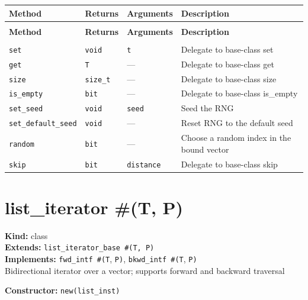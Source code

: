 \documentclass[11pt,letterpaper]{report}
\begin{document}
\begin{xltabular}{\linewidth}{>{\small}p{1.35in} >{\small}p{1.25in} >{\small}p{0.95in} >{\small}X}
\toprule
\textbf{Method} & \textbf{Returns} & \textbf{Arguments} & \textbf{Description} \\
\midrule
\endfirsthead
{} \\
\midrule
\textbf{Method} & \textbf{Returns} & \textbf{Arguments} & \textbf{Description} \\
\midrule
\endhead
\midrule
{} \\
\endfoot
\bottomrule
\endlastfoot
\texttt{set} & \texttt{void} & \texttt{t} & Delegate to base-class set \\
\texttt{get} & \texttt{T} & --- & Delegate to base-class get \\
\texttt{size} & \texttt{size\_t} & --- & Delegate to base-class size \\
\texttt{is\_empty} & \texttt{bit} & --- & Delegate to base-class is\_empty \\
\texttt{set\_seed} & \texttt{void} & \texttt{seed} & Seed the RNG \\
\texttt{set\_default\_seed} & \texttt{void} & --- & Reset RNG to the default seed \\
\texttt{random} & \texttt{bit} & --- & Choose a random index in the bound vector \\
\texttt{skip} & \texttt{bit} & \texttt{distance} & Delegate to base-class skip \\
\end{xltabular}

\section{list\_iterator \#(T, P)}
\label{cls:listiteratorTP}

\noindent\textbf{Kind:} class\\
\noindent\textbf{Extends:} \texttt{list\_iterator\_base \#(T, P)}\\
\noindent\textbf{Implements:} \texttt{fwd\_intf \#(T}, \texttt{P)}, \texttt{bkwd\_intf \#(T}, \texttt{P)}\\
\noindent Bidirectional iterator over a vector; supports forward and backward traversal

\noindent\textbf{Constructor:} \texttt{new(list\_inst)}
\end{document}
